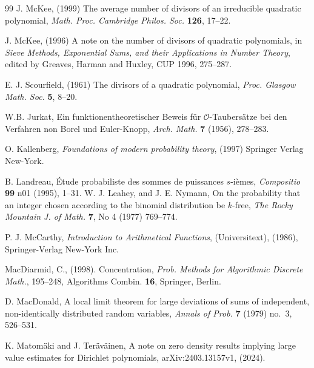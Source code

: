 \documentclass[11pt,draft,reqno]{amsart}
\theoremstyle{definition}
\theoremstyle{remarks}
\numberwithin{equation}{section}
\begin{document}
\begin{thebibliography}{99}
  J. McKee,  (1999)  The average number of divisors of an irreducible quadratic polynomial,  \emph{Math.
Proc. Cambridge Philos. Soc.} {\bf 126}, 17--22.


  J. McKee,  (1996) A note on the  number of divisors of quadratic polynomials,
 in  \emph{Sieve Methods, Exponential Sums, and their Applications in Number Theory}, edited by Greaves, Harman and Huxley, CUP 1996, 275--287.

  E. J. Scourfield, (1961) The divisors of a quadratic polynomial, \emph{Proc. Glasgow Math. Soc.} {\bf 5}, 8--20.


    W.B. Jurkat,       Ein funktionentheoretischer Beweis f\"ur $\mathcal O$-Taubers\"atze bei den Verfahren non Borel und Euler-Knopp, \emph{Arch. Math.} {\bf 7}  (1956),
278--283.


 O. Kallenberg,  \emph{Foundations of modern probability theory}, (1997)  Springer Verlag New-York.

    B. Landreau,      \'Etude probabiliste des sommes de puissances $s$-i\`emes, \emph{Compositio} {\bf 99} n01  (1995), 1--31.    W. J. Leahey, and J. E. Nymann,  On the probability that an integer chosen according to the binomial  distribution be $k$-free,  \emph{ The Rocky Mountain J. of Math.} {\bf 7}, No 4 (1977)  769--774.
 





   P. J. McCarthy,  {\it Introduction to Arithmetical Functions}, (Universitext), (1986), Springer-Verlag New-York Inc.

    MacDiarmid,  C.,  (1998).  Concentration, \emph{Prob. Methods for Algorithmic Discrete Math.}, 195--248, Algorithms Combin. {\bf
16}, Springer, Berlin.

 D. MacDonald,    A local limit theorem for large deviations of sums of independent, non-identically distributed
random variables, \emph{Annals of Prob.} {\bf 7} (1979) no.\ 3, 526--531.

   K. Matom\"aki and J. Ter\"av\"ainen, A note on zero density results implying large value estimates for Dirichlet polynomials,   arXiv:2403.13157v1, (2024).


\end{thebibliography}
\end{document}
